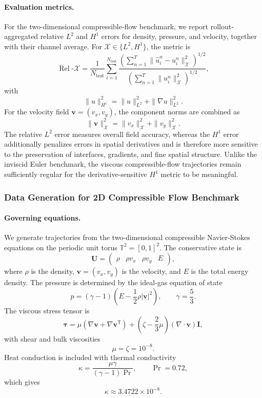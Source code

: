 \documentclass[11pt]{article}
\begin{document}
\paragraph{Evaluation metrics.} For the two-dimensional compressible-flow benchmark, we report
rollout-aggregated relative $L^2$ and $H^1$ errors for density, pressure, and velocity, together with their channel average. For
$\mathcal X\in\{L^2,H^1\}$, the metric is
\[
    \operatorname{Rel}\text{-}\mathcal X
    =
    \frac{1}{N_{\mathrm{test}}}
    \sum_{i=1}^{N_{\mathrm{test}}}
    \frac{
        \left(
            \sum_{n=1}^{T}
            \|\widehat u_i^n-u_i^n\|_{\mathcal X}^2
        \right)^{1/2}
    }{
        \left(
            \sum_{n=1}^{T}
            \|u_i^n\|_{\mathcal X}^2
        \right)^{1/2}
    },
\]
with
\[
    \|u\|_{H^1}^2
    =
    \|u\|_{L^2}^2
    +
    \|\nabla u\|_{L^2}^2.
\]
For the velocity field $\mathbf v=(v_x,v_y)$, the component norms are combined as
\[
    \|\mathbf v\|_{\mathcal X}^2
    =
    \|v_x\|_{\mathcal X}^2
    +
    \|v_y\|_{\mathcal X}^2.
\]
The relative $L^2$ error measures overall field accuracy, whereas the $H^1$ error additionally penalizes errors in spatial derivatives and is therefore more sensitive to the preservation of interfaces, gradients, and fine spatial structure. Unlike the inviscid Euler benchmark, the
viscous compressible-flow trajectories remain sufficiently regular for the derivative-sensitive $H^1$ metric to be meaningful.

\subsubsection{Data Generation for 2D Compressible Flow Benchmark}
\label{app:cfd2d_data_generation}

\paragraph{Governing equations.}
We generate trajectories from the two-dimensional compressible Navier-Stokes equations on the periodic unit torus $\mathbb{T}^2=[0,1]^2$.
The conservative state is
\[
    \mathbf{U}
    =
    \begin{pmatrix}
        \rho &
        \rho v_x &
        \rho v_y &
        E
    \end{pmatrix},
\]
where $\rho$ is the density, $\mathbf{v}=(v_x,v_y)$ is the velocity, and $E$ is the total energy density. The pressure is determined by the ideal-gas equation of state
\[
    p
    =
    (\gamma-1)
    \left(
        E-\frac{1}{2}\rho|\mathbf{v}|^2
    \right),
    \qquad
    \gamma=\frac{5}{3}.
\]
The viscous stress tensor is
\[
    \boldsymbol{\tau}
    =
    \mu
    \left(
        \nabla\mathbf{v}
        +
        \nabla\mathbf{v}^{\mathsf T}
    \right)
    +
    \left(
        \zeta-\frac{2}{3}\mu
    \right)
    (\nabla\cdot\mathbf{v})\mathbf{I},
\]
with shear and bulk viscosities
\[
    \mu=\zeta=10^{-8}.
\]
Heat conduction is included with thermal conductivity
\[
    \kappa
    =
    \frac{\mu\gamma}
    {(\gamma-1)\operatorname{Pr}},
    \qquad
    \operatorname{Pr}=0.72,
\]
which gives
\[
    \kappa
    \approx
    3.4722\times10^{-8}.
\]
\end{document}
